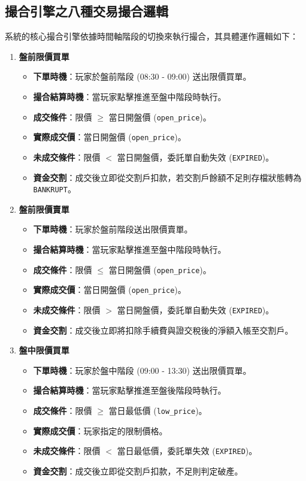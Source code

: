 \documentclass[UTF8, a4paper, 12pt, fontset=none]{ctexart}
\begin{document}
    \subsection{撮合引擎之八種交易撮合邏輯}
    系統的核心撮合引擎依據時間軸階段的切換來執行撮合，其具體運作邏輯如下：

    \begin{enumerate}[label=(\arabic*)]
        \item \textbf{盤前限價買單}
        \begin{itemize}
            \item \textbf{下單時機}：玩家於盤前階段 (08:30 - 09:00) 送出限價買單。
            \item \textbf{撮合結算時機}：當玩家點擊推進至盤中階段時執行。
            \item \textbf{成交條件}：限價 $\ge$ 當日開盤價 (\texttt{open\_price})。
            \item \textbf{實際成交價}：當日開盤價 (\texttt{open\_price})。
            \item \textbf{未成交條件}：限價 $<$ 當日開盤價，委託單自動失效 (\texttt{EXPIRED})。
            \item \textbf{資金交割}：成交後立即從交割戶扣款，若交割戶餘額不足則存檔狀態轉為 \texttt{BANKRUPT}。
        \end{itemize}

        \item \textbf{盤前限價賣單}
        \begin{itemize}
            \item \textbf{下單時機}：玩家於盤前階段送出限價賣單。
            \item \textbf{撮合結算時機}：當玩家點擊推進至盤中階段時執行。
            \item \textbf{成交條件}：限價 $\le$ 當日開盤價 (\texttt{open\_price})。
            \item \textbf{實際成交價}：當日開盤價 (\texttt{open\_price})。
            \item \textbf{未成交條件}：限價 $>$ 當日開盤價，委託單自動失效 (\texttt{EXPIRED})。
            \item \textbf{資金交割}：成交後立即將扣除手續費與證交稅後的淨額入帳至交割戶。
        \end{itemize}

        \item \textbf{盤中限價買單}
        \begin{itemize}
            \item \textbf{下單時機}：玩家於盤中階段 (09:00 - 13:30) 送出限價買單。
            \item \textbf{撮合結算時機}：當玩家點擊推進至盤後階段時執行。
            \item \textbf{成交條件}：限價 $\ge$ 當日最低價 (\texttt{low\_price})。
            \item \textbf{實際成交價}：玩家指定的限制價格。
            \item \textbf{未成交條件}：限價 $<$ 當日最低價，委託單失效 (\texttt{EXPIRED})。
            \item \textbf{資金交割}：成交後立即從交割戶扣款，不足則判定破產。
        \end{itemize}


\end{enumerate}
\end{document}
